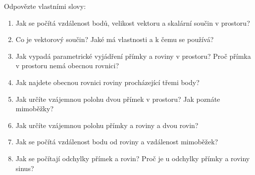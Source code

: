 \begin{problem}
  Odpovězte vlastními slovy:
  \begin{enumerate}
    \item Jak se počítá vzdálenost bodů, velikost vektoru a skalární součin v prostoru?
    \item Co je vektorový součin? Jaké má vlastnosti a k čemu se používá?
    \item Jak vypadá parametrické vyjádření přímky a roviny v prostoru? Proč přímka v prostoru nemá obecnou rovnici?
    \item Jak najdete obecnou rovnici roviny procházející třemi body?
    \item Jak určíte vzájemnou polohu dvou přímek v prostoru? Jak poznáte mimoběžky?
    \item Jak určíte vzájemnou polohu přímky a roviny a dvou rovin?
    \item Jak se počítá vzdálenost bodu od roviny a vzdálenost mimoběžek?
    \item Jak se počítají odchylky přímek a rovin? Proč je u odchylky přímky a roviny sinus?
  \end{enumerate}
\end{problem}
